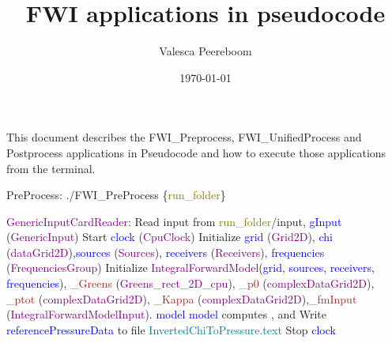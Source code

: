 \documentclass{article}
\title{FWI applications in pseudocode}
\author{Valesca Peereboom}
\date{\today}
\begin{document}
\maketitle
\noindent This document describes the FWI\_Preprocess, FWI\_UnifiedProcess and Postprocess applications in Pseudocode and how to execute those applications from the terminal.
\newline

\begin{algorithm}
\caption{PreProcess: ./FWI\_PreProcess \{\textcolor{olive}{run\_folder}\}}
\begin{algorithmic}
\State \textcolor{purple}{GenericInputCardReader}: Read input from \textcolor{olive}{run\_folder}/input, \textcolor{blue}{gInput} (\textcolor{purple}{GenericInput})
\State Start \textcolor{blue}{clock} (\textcolor{purple}{CpuClock})
\State Initialize \textcolor{blue}{grid} (\textcolor{purple}{Grid2D}), \textcolor{blue}{chi} (\textcolor{purple}{dataGrid2D}),\State \textcolor{blue}{sources} (\textcolor{purple}{Sources}), \textcolor{blue}{receivers} (\textcolor{purple}{Receivers}), \textcolor{blue}{frequencies} (\textcolor{purple}{FrequenciesGroup})
\State {}
\State Initialize \textcolor{purple}{IntegralForwardModel}(\textcolor{blue}{grid}, \textcolor{blue}{sources}, \textcolor{blue}{receivers}, \textcolor{blue}{frequencies}), \State \textcolor{brown}{\_Greens} (\textcolor{purple}{Greens\_rect\_2D\_cpu}), \textcolor{brown}{\_p0} (\textcolor{purple}{complexDataGrid2D}), \State \textcolor{brown}{\_ptot} (\textcolor{purple}{complexDataGrid2D}), \textcolor{brown}{\_Kappa} (\textcolor{purple}{complexDataGrid2D}),\State \textcolor{brown}{\_fmInput} (\textcolor{purple}{IntegralForwardModelInput}).
\State \Return \textcolor{blue}{model}
\EndProcedure
\State \textcolor{blue}{model} computes ,  and 
\State Write \textcolor{blue}{referencePressureData} to file \textcolor{teal}{InvertedChiToPressure.text}
\EndProcedure
\State Stop \textcolor{blue}{clock}
\end{algorithmic}
\end{algorithm}
\end{document}

